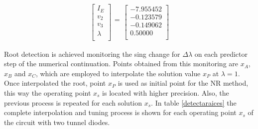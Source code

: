 \documentclass[conference,letterpaper,onecolumn]{IEEEtran}
\begin{document}
\begin{displaymath}
\begin{array}{r}
\left[\begin{array}{r} I_E \\ v_2  \\ v_3  \\ \lambda  \\
\end{array}\right]
\begin{array}{r}
 \\ = \\ \\ \end{array}
\left[\begin{array}{r}
-7.955452 \\
-0.123579  \\
-0.149062 \\
0.50000 \\
\end{array}\right]
\end{array}
\end{displaymath}

Root detection is achieved monitoring the sing change for $\Delta \lambda$ on each predictor step of the numerical continuation. Points obtained from this monitoring are $x_A$, $x_B$ and $x_C$, which are employed to interpolate the solution value $x_P$ at $\lambda=1$. Once interpolated the root, point $x_P$ is used as initial point for the NR method, this way the operating point  $x_s$ is located with higher precision. Also, the previous process is repeated for each solution $x_s$. In table \ref{detectaraices} the complete interpolation and tuning process is shown for each operating point $x_s$ of the circuit with two tunnel diodes.
\end{document}
